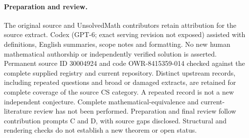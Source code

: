 \documentclass[11pt]{article}
\begin{document}
\paragraph{Preparation and review.}
The original source and UnsolvedMath contributors retain attribution for the source extract. Codex (GPT-6; exact serving revision not exposed) assisted with definitions, English summaries, scope notes and formatting. No new human mathematical authorship or independently verified solution is asserted. Permanent source ID 30004924 and code OWR-8415359-014 checked against the complete supplied registry and current repository. Distinct upstream records, including repeated questions and broad or damaged extracts, are retained for complete coverage of the source CS category. A repeated record is not a new independent conjecture. Complete mathematical-equivalence and current-literature review has not been performed. Preparation and final review follow contribution prompts C and D, with source gaps disclosed. Structural and rendering checks do not establish a new theorem or open status.
\label{end:30004924}
\end{document}
